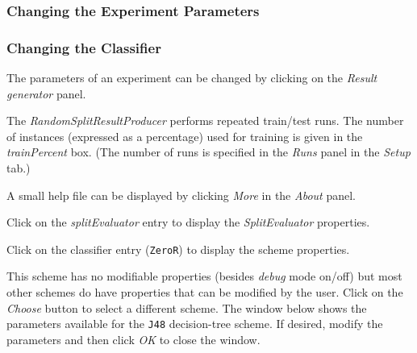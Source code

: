 \documentclass[a4paper]{article}
\begin{document}
\subsubsection{Changing the Experiment Parameters}

\subsubsection*{Changing the Classifier}

The parameters of an experiment can be changed by clicking on the \textit{Result generator} panel.
\begin{center}
\end{center}

The \textit{RandomSplitResultProducer} performs repeated train/test runs. The number of instances (expressed as a percentage) used for training is given in the \textit{trainPercent} box. (The number of runs is specified in the \textit{Runs} panel in the \textit{Setup} tab.)

A small help file can be displayed by clicking \textit{More} in the \textit{About} panel.
\begin{center}
\end{center}

Click on the \textit{splitEvaluator} entry to display the \textit{SplitEvaluator} properties.
\begin{center}
\end{center}

Click on the classifier entry (\texttt{ZeroR}) to display the scheme properties.
\begin{center}
\end{center}

This scheme has no modifiable properties (besides \textit{debug} mode on/off) but most other schemes do have properties that can be modified by the user. Click on the \textit{Choose} button to select a different scheme. The window below shows the parameters available for the \texttt{J48} decision-tree scheme. If desired, modify the parameters and then click \textit{OK} to close the window.
\begin{center}
\end{center}
\end{document}
